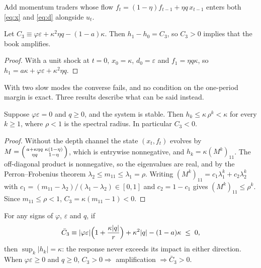 Add momentum traders whose flow $f_t=(1-\eta)f_{t-1}+\eta q\,x_{t-1}$ enters both \eqref{eq:x} and \eqref{eq:d} alongside $u_t$.

\begin{proposition}\label{prop:t6m}
Let $C_3\equiv\varphi\varepsilon+\kappa^2\eta q-(1-a)\kappa$. Then $h_1-h_0=C_3$, so $C_3>0$ implies that the book amplifies.
\end{proposition}

\begin{proof}
With a unit shock at $t=0$, $x_0=\kappa$, $d_0=\varepsilon$ and $f_1=\eta q\kappa$, so $h_1=a\kappa+\varphi\varepsilon+\kappa^2\eta q$.
\end{proof}

With two slow modes the converse fails, and no condition on the one-period margin is exact. Three results describe what can be said instead.

\begin{theorem}\label{thm:nomom}
Suppose $\varphi\varepsilon=0$ and $q\ge0$, and the system is stable. Then $h_k\le\kappa\,\rho^k<\kappa$ for every $k\ge1$, where $\rho<1$ is the spectral radius. In particular $C_3<0$.
\end{theorem}

\begin{proof}
Without the depth channel the state $(x_t,f_t)$ evolves by $M=\begin{psmallmatrix}a+\kappa\eta q&\kappa(1-\eta)\\ \eta q&1-\eta\end{psmallmatrix}$, which is entrywise nonnegative, and $h_k=\kappa(M^k)_{11}$. The off-diagonal product is nonnegative, so the eigenvalues are real, and by the Perron--Frobenius theorem $\lambda_2\le m_{11}\le\lambda_1=\rho$. Writing $(M^k)_{11}=c_1\lambda_1^k+c_2\lambda_2^k$ with $c_1=(m_{11}-\lambda_2)/(\lambda_1-\lambda_2)\in[0,1]$ and $c_2=1-c_1$ gives $(M^k)_{11}\le\rho^k$. Since $m_{11}\le\rho<1$, $C_3=\kappa(m_{11}-1)<0$.
\end{proof}

\begin{theorem}\label{thm:noover}
For any signs of $\varphi$, $\varepsilon$ and $q$, if
\[
\bar C_3\equiv|\varphi\varepsilon|\Bigl(1+\frac{\kappa|q|}{r}\Bigr)+\kappa^2|q|-(1-a)\kappa\;\le\;0,
\]
then $\sup_k|h_k|=\kappa$: the response never exceeds its impact in either direction. When $\varphi\varepsilon\ge0$ and $q\ge0$, $C_3>0\Rightarrow$ amplification $\Rightarrow\bar C_3>0$.
\end{theorem}

